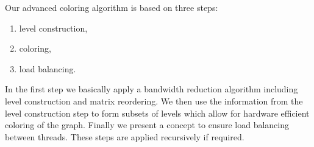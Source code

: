 
Our advanced coloring algorithm is based on three steps:
\begin{enumerate}
	\item level construction,
	\item \DK coloring,
	\item load balancing.
\end{enumerate}
In the first step we basically apply a bandwidth reduction algorithm
including level construction and matrix reordering. We then use the
information from the level construction step to form subsets of levels
which allow for hardware efficient \DK coloring of the graph. Finally
we present a concept to ensure load balancing between threads. These steps
are applied recursively if required.



